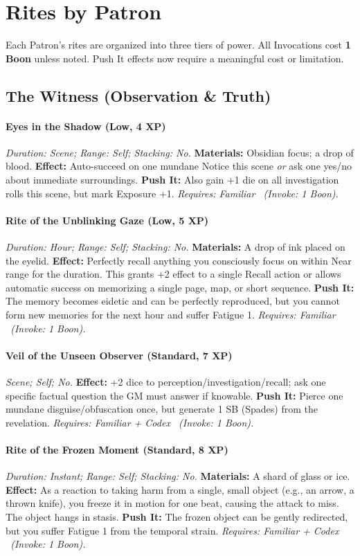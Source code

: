 \section{Rites by Patron}
Each Patron's rites are organized into three tiers of power. All Invocations cost \textbf{1 Boon} unless noted. Push It effects now require a meaningful cost or limitation.

\subsection{The Witness (Observation \& Truth)}
\paragraph{Eyes in the Shadow (Low, 4 XP)} \emph{Duration: Scene; Range: Self; Stacking: No.}
\textbf{Materials:} Obsidian focus; a drop of blood.
\textbf{Effect:} Auto-succeed on one mundane Notice this scene \emph{or} ask one yes/no about immediate surroundings.
\textbf{Push It:} Also gain +1 die on all investigation rolls this scene, but mark Exposure +1.
\emph{Requires: Familiar \ (\textit{Invoke:} 1 Boon).}
\paragraph{Rite of the Unblinking Gaze (Low, 5 XP)} \emph{Duration: Hour; Range: Self; Stacking: No.}
\textbf{Materials:} A drop of ink placed on the eyelid.
\textbf{Effect:} Perfectly recall anything you consciously focus on within Near range for the duration. This grants +2 effect to a single Recall action or allows automatic success on memorizing a single page, map, or short sequence.
\textbf{Push It:} The memory becomes eidetic and can be perfectly reproduced, but you cannot form new memories for the next hour and suffer Fatigue 1.
\emph{Requires: Familiar \ (\textit{Invoke:} 1 Boon).}
\paragraph{Veil of the Unseen Observer (Standard, 7 XP)} \emph{Scene; Self; No.}
\textbf{Effect:} +2 dice to perception/investigation/recall; ask one specific factual question the GM must answer if knowable.
\textbf{Push It:} Pierce one mundane disguise/obfuscation once, but generate 1 SB (Spades) from the revelation.
\emph{Requires: Familiar + Codex \ (\textit{Invoke:} 1 Boon).}
\paragraph{Rite of the Frozen Moment (Standard, 8 XP)} \emph{Duration: Instant; Range: Self; Stacking: No.}
\textbf{Materials:} A shard of glass or ice.
\textbf{Effect:} As a reaction to taking harm from a single, small object (e.g., an arrow, a thrown knife), you freeze it in motion for one beat, causing the attack to miss. The object hangs in stasis.
\textbf{Push It:} The frozen object can be gently redirected, but you suffer Fatigue 1 from the temporal strain.
\emph{Requires: Familiar + Codex \ (\textit{Invoke:} 1 Boon).}
